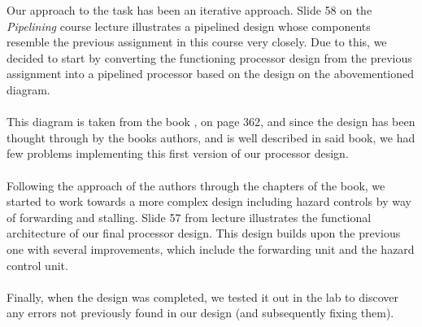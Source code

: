 Our approach to the task has been an iterative approach. Slide 58 on the
\emph{Pipelining} \cite{slides-6} course lecture illustrates a pipelined design
whose components resemble the previous assignment in this course very closely.
Due to this, we decided to start by converting the functioning processor design
from the previous assignment into a pipelined processor based on the design on
the abovementioned diagram.
\paragraph*{}
This diagram is taken from the book \cite{patterson12}, on page 362, and since
the design has been thought through by the books authors, and is well described
in said book, we had few problems implementing this first version of our
processor design.
\paragraph*{}
Following the approach of the authors through the chapters of the book, we
started to work towards a more complex design including hazard controls by way
of forwarding and stalling. Slide 57 from lecture \cite{slides-7} illustrates
the functional architecture of our final processor design. This design builds
upon the previous one with several improvements, which include the forwarding
unit and the hazard control unit.
\paragraph*{}
Finally, when the design was completed, we tested it out in the lab to discover
any errors not previously found in our design (and subsequently fixing them).
